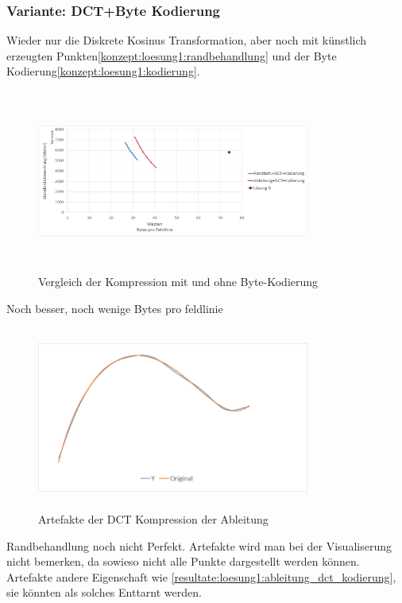 \subsubsection{Variante: DCT+Byte Kodierung}
Wieder nur die Diskrete Kosinus Transformation, aber noch mit künstlich erzeugten Punkten\ref{konzept:loesung1:randbehandlung} und der Byte Kodierung\ref{konzept:loesung1:kodierung}.
\begin{figure}[!htbp]
	\center
	\includegraphics[width=0.8\textwidth,height=6cm,keepaspectratio]{./pictures/resultate/loesung1/loesung1-7/loesung1_7.png}
	\caption{Vergleich der Kompression mit und ohne Byte-Kodierung}
	\label{resultate:loesung1:dct:randbehandlung}
\end{figure}
Noch besser, noch wenige Bytes pro feldlinie
\begin{figure}[!htbp]
	\center
	\includegraphics[width=0.8\textwidth,height=6cm,keepaspectratio]{./pictures/resultate/loesung1/loesung1-7/artefakte.png}
	\caption{Artefakte der DCT Kompression der Ableitung}
	\label{resultate:loesung1:dct:randbehandlung:artefakte:}
\end{figure} 
Randbehandlung noch nicht Perfekt.
Artefakte wird man bei der Visualiserung nicht bemerken, da sowieso nicht alle Punkte dargestellt werden können. Artefakte andere Eigenschaft wie \ref{resultate:loesung1:ableitung_dct_kodierung}, sie könnten als solches Enttarnt werden.

